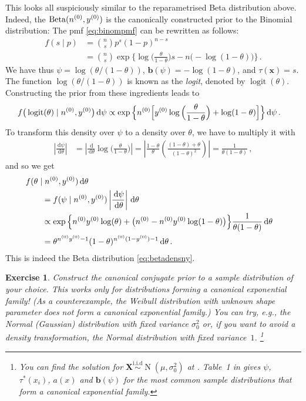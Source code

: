 \documentclass[12pt,a4paper	,twoside]{article}
\newcommand{\dd}{\,\mathrm{d}}
\newcommand{\mbf}[1]{\mathbf{#1}}
\newcommand{\bs}[1]{\boldsymbol{#1}}
\renewcommand{\vec}[1]{{\bs#1}}
\newcommand{\be}{\operatorname{Beta}}
\newcommand{\norm}{\operatorname{N}}
\newcommand{\logit}{\operatorname{logit}} %
\newtheorem{myex}{Exercise}
\begin{document}
This looks all suspiciously similar to the reparametrised Beta distribution above.
Indeed, the $\be(\nz,\yz)$ is the canonically constructed prior to the Binomial distribution:
The pmf \eqref{eq:binompmf} can be rewritten as follows:
\begin{align}
f(s\mid p)
 &= {n \choose s} p^s (1-p)^{n-s} \\
 &= {n \choose s} \exp\Big\{ \log\Big(\frac{\theta}{1-\theta}\Big) s - n \big(-\log(1-\theta)\big) \Big\} \,.
\end{align}
We have thus $\psi = \log(\theta/(1-\theta))$, $\mbf{b}(\psi) = -\log(1-\theta)$, and $\tau(\vec{x}) = s$.
The function $\log(\theta/(1-\theta))$ is known as the \emph{logit}, denoted by $\logit(\theta)$.
Constructing the prior from these ingredients leads to
\begin{align}
f\big(\logit(\theta) \mid \nz, \yz\big) \dd\psi %
 &\propto \exp\Big\{ \nz \Big[ \yz \log\Big(\frac{\theta}{1-\theta}\Big) + \log(1-\theta) \Big] \Big\} \dd\psi\,.
\end{align}
To transform this density over $\psi$ to a density over $\theta$,
we have to multiply it with
\begin{align}
\left|\frac{\dd\psi}{\dd\theta}\right|
 &= \left|\frac{\dd}{\dd\theta} \log\Big(\frac{\theta}{1-\theta}\Big)\right|
  = \left| \frac{1-\theta}{\theta}\left(\frac{(1-\theta)+\theta}{(1-\theta)^2}\right) \right|
  = \frac{1}{\theta(1-\theta)}\,,
\end{align}
and so we get
\begin{align}
\lefteqn{f(\theta\mid \nz, \yz)\dd\theta} \qquad \\  
 &= f(\psi\mid \nz, \yz) \left|\frac{\dd\psi}{\dd\theta}\right| \dd\theta\\
 &\propto \exp\Big\{ \nz\yz\log(\theta) + \big(\nz - \nz\yz\log(1-\theta)\big)\Big\} \frac{1}{\theta(1-\theta)}\dd\theta\\
 &= \theta^{\nz\yz - 1} (1-\theta)^{\nz(1-\yz) - 1} \dd\theta\,.
\end{align}
This is indeed the Beta distribution \eqref{eq:betadensny}.%

\begin{myex}
Construct the canonical conjugate prior to a sample distribution of your choice.
This works only for distributions forming a canonical exponential family!
(As a counterexample, the Weibull distribution with unknown shape parameter does not form a canonical exponential family.)
You can try, e.g., the Normal (Gaussian) distribution with fixed variance $\sigma^2_0$
or, if you want to avoid a density transformation, the Normal distribution with fixed variance~$1$.%
\footnote{You can find the solution for $\vec{X} \stackrel{\text{i.i.d}}{\sim} \norm(\mu, \sigma^2_0)$
at \textcite[pp.~14f]{2013:diss-gw}.
Table~1 in \textcite{2005:quaeghebeurcooman} gives $\psi$, $\tau^*(x_i)$, $a(x)$ and $\mbf{b}(\psi)$
for the most common sample distributions that form a canonical exponential family.}
\end{myex}
\end{document}
